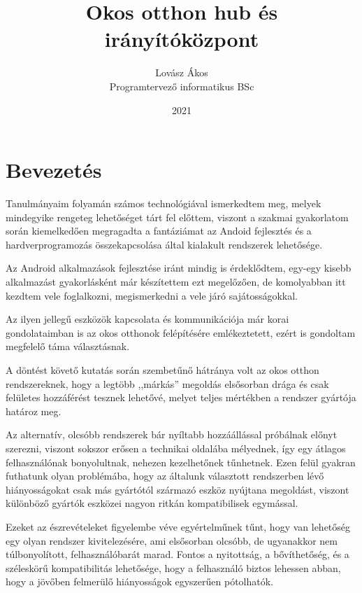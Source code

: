 \documentclass[
]{thesis-ekf}
\theoremstyle{definition}
\theoremstyle{remark}
\begin{document}
\title{Okos otthon hub és irányítóközpont}
\author{Lovász Ákos\\Programtervező informatikus BSc}
\date{2021}
\maketitle
\tableofcontents


\chapter*{Bevezetés}
Tanulmányaim folyamán számos technológiával ismerkedtem meg, melyek mindegyike rengeteg
lehetőséget tárt fel előttem, viszont a szakmai gyakorlatom során kiemelkedően megragadta a fantáziámat az Andoid
fejlesztés és a hardverprogramozás összekapcsolása által kialakult rendszerek lehetősége.
\par
Az Android alkalmazások fejlesztése iránt mindig is érdeklődtem, egy-egy kisebb alkalmazást gyakorlásként
már készítettem ezt megelőzően, de komolyabban itt kezdtem vele foglalkozni, megismerkedni a vele járó
sajátosságokkal.
\par
Az ilyen jellegű eszközök kapcsolata és kommunikációja már korai gondolataimban is az okos otthonok felépítésére
emlékeztetett, ezért is gondoltam megfelelő táma választásnak.
\par
A döntést követő kutatás során szembetűnő hátránya volt az okos otthon rendszereknek, hogy a legtöbb ,,márkás''
megoldás elsősorban drága és csak felületes hozzáférést tesznek lehetővé, melyet teljes mértékben a rendszer
gyártója határoz meg. 
\par
Az alternatív, olcsóbb rendszerek bár nyíltabb hozzáállással próbálnak előnyt szerezni,
viszont sokszor erősen a technikai oldalába mélyednek, így egy átlagos felhasználónak bonyolultnak, 
nehezen kezelhetőnek tűnhetnek. Ezen felül gyakran futhatunk olyan problémába, hogy az általunk választott
rendszerben lévő hiányosságokat csak más gyártótól származó eszköz nyújtana megoldást, viszont különböző
gyártók eszközei nagyon ritkán kompatibilisek egymással.
\par
Ezeket az észrevételeket figyelembe véve egyértelműnek tűnt, hogy van lehetőség egy olyan rendszer kivitelezésére,
ami elsősorban olcsóbb, de ugyanakkor nem túlbonyolított, felhasználóbarát marad. Fontos a nyitottság, a bővíthetőség,
és a széleskörű kompatibilitás lehetősége, hogy a felhasználó biztos lehessen abban, hogy a jövőben felmerülő
hiányosságok egyszerűen pótolhatók.
\end{document}
